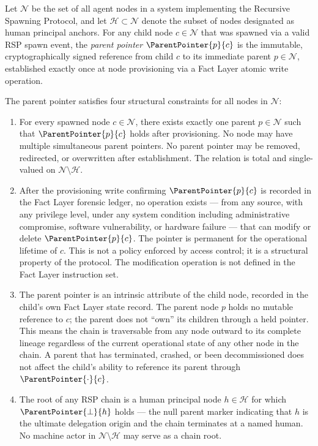 \begin{dfn}\label{dfn:parent-pointer}
Let $\mathcal{N}$ be the set of all agent nodes in a \bxthree{} system implementing the Recursive Spawning Protocol, and let $\mathcal{H} \subset \mathcal{N}$ denote the subset of nodes designated as human principal anchors. For any child node $c \in \mathcal{N}$ that was spawned via a valid RSP spawn event, the \emph{parent pointer} $\ParentPointer{p}{c}$ is the immutable, cryptographically signed reference from child $c$ to its immediate parent $p \in \mathcal{N}$, established exactly once at node provisioning via a Fact Layer atomic write operation.

The parent pointer satisfies four structural constraints for all nodes in $\mathcal{N}$:

\begin{enumerate}
    \item[(P1) \textbf{Uniqueness}] For every spawned node $c \in \mathcal{N}$, there exists exactly one parent $p \in \mathcal{N}$ such that $\ParentPointer{p}{c}$ holds after provisioning. No node may have multiple simultaneous parent pointers. No parent pointer may be removed, redirected, or overwritten after establishment. The relation is total and single-valued on $\mathcal{N} \setminus \mathcal{H}$.

    \item[(P2) \textbf{Immutability}] After the provisioning write confirming $\ParentPointer{p}{c}$ is recorded in the Fact Layer forensic ledger, no operation exists — from any source, with any privilege level, under any system condition including administrative compromise, software vulnerability, or hardware failure — that can modify or delete $\ParentPointer{p}{c}$. The pointer is permanent for the operational lifetime of $c$. This is not a policy enforced by access control; it is a structural property of the protocol. The modification operation is not defined in the Fact Layer instruction set.

    \item[(P3) \textbf{Directionality}] The parent pointer is an intrinsic attribute of the child node, recorded in the child's own Fact Layer state record. The parent node $p$ holds no mutable reference to $c$; the parent does not ``own'' its children through a held pointer. This means the chain is traversable from any node outward to its complete lineage regardless of the current operational state of any other node in the chain. A parent that has terminated, crashed, or been decommissioned does not affect the child's ability to reference its parent through $\ParentPointer{\cdot}{c}$.

    \item[(P4) \textbf{Human Anchor Termination}] The root of any RSP chain is a human principal node $h \in \mathcal{H}$ for which $\ParentPointer{\bot}{h}$ holds — the null parent marker indicating that $h$ is the ultimate delegation origin and the chain terminates at a named human. No machine actor in $\mathcal{N} \setminus \mathcal{H}$ may serve as a chain root.
\end{enumerate}
\end{dfn}

